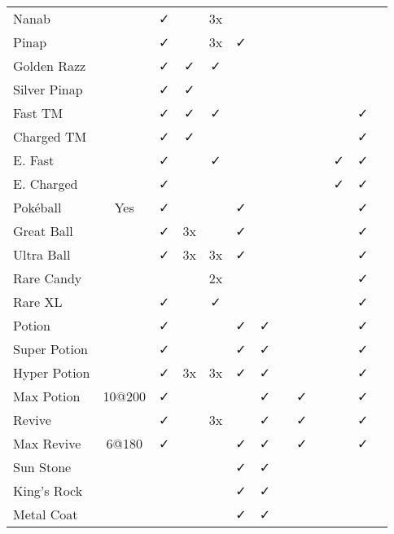 \documentclass[ebook,10pt,openany,oneside]{memoir}
\begin{document}
\begin{table}
\begin{tabular}{p{}cccccccccccc}
Nanab             &      & ✓ &     & 3x &    &     &     &     &   &   &   &   \\
Pinap             &      & ✓ &     & 3x &  ✓ &     &     &     &   &   &   &   \\
Golden Razz       &      & ✓ & ✓   & ✓  &    &     &     &     &   &   &   &   \\
Silver Pinap      &      & ✓ & ✓   &    &    &     &     &     &   &   &   &   \\
Fast TM           &      & ✓ & ✓   & ✓  &    &     &     &     &   &   & ✓ &   \\
Charged TM        &      & ✓ & ✓   &    &    &     &     &     &   &   & ✓ &   \\
E. Fast           &      & ✓ &     & ✓  &    &     &     &     &   & ✓ & ✓ &   \\
E. Charged        &      & ✓ &     &    &    &     &     &     &   & ✓ & ✓ &   \\
Pokéball          & Yes  & ✓ &     &    &  ✓ &     &     &     &   &   & ✓ &   \\
Great Ball        &      & ✓ & 3x  &    &  ✓ &     &     &     &   &   & ✓ &   \\
Ultra Ball        &      & ✓ & 3x  & 3x &  ✓ &     &     &     &   &   & ✓ &   \\
Rare Candy        &      &   &     & 2x &    &     &     &     &   &   & ✓ &   \\
Rare XL           &      & ✓ &     & ✓  &    &     &     &     &   &   & ✓ &   \\
Potion            &      & ✓ &     &    &  ✓ &  ✓  &     &     &   &   & ✓ &   \\
Super Potion      &      & ✓ &     &    &  ✓ &  ✓  &     &     &   &   & ✓ &   \\
Hyper Potion      &      & ✓ & 3x  & 3x &  ✓ &  ✓  &     &     &   &   & ✓ &   \\
Max Potion        &10@200& ✓ &     &    &    &  ✓  &     & ✓   &   &   & ✓ &   \\
Revive            &      & ✓ &     & 3x &    &  ✓  &     &  ✓  &   &   & ✓ &   \\
Max Revive        & 6@180& ✓ &     &    &  ✓ &  ✓  &     &  ✓  &   &   & ✓ &   \\
Sun Stone         &      &   &     &    &  ✓ &  ✓  &     &     &   &   &   &   \\
King's Rock       &      &   &     &    &  ✓ &  ✓  &     &     &   &   &   &   \\
Metal Coat        &      &   &     &    &  ✓ &  ✓  &     &     &   &   &   &   \\

\end{tabular}
\end{table}
\end{document}
